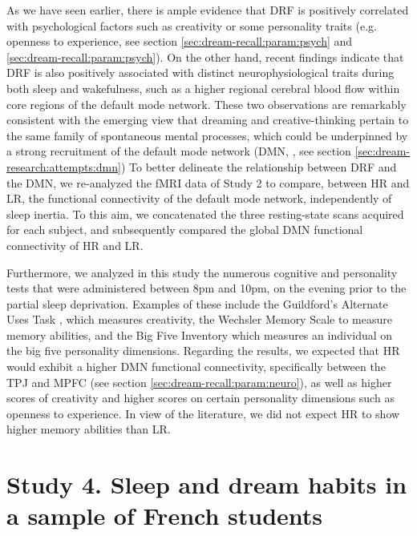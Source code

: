 As we have seen earlier, there is ample evidence that DRF is positively correlated with psychological factors such as creativity or some personality traits (e.g. openness to experience, see section \ref{sec:dream-recall:param:psych} and \ref{sec:dream-recall:param:psych}). On the other hand, recent findings indicate that DRF is also positively associated with distinct neurophysiological traits during both sleep and wakefulness, such as a higher regional cerebral blood flow within core regions of the default mode network. These two observations are remarkably consistent with the emerging view that dreaming and creative-thinking pertain to the same family of spontaneous mental processes, which could be underpinned by a strong recruitment of the default mode network (DMN, \citealp{christoff_mind-wandering_2016}, see section \ref{sec:dream-research:attempts:dmn}) To better delineate the relationship between DRF and the DMN, we re-analyzed the fMRI data of Study 2 to compare, between HR and LR, the functional connectivity of the default mode network, independently of sleep inertia. To this aim, we concatenated the three resting-state scans acquired for each subject, and subsequently compared the global DMN functional connectivity of HR and LR.

Furthermore, we analyzed in this study the numerous cognitive and personality tests that were administered between 8pm and 10pm, on the evening prior to the partial sleep deprivation. Examples of these include the Guildford's Alternate Uses Task \citep{guildford_alternate_1978}, which measures creativity, the Wechsler Memory Scale \citep{wechsler_mem-iii:_2001} to measure memory abilities, and the Big Five Inventory \citep{john_big_1999} which measures an individual on the big five personality dimensions. Regarding the results, we expected that HR would exhibit a higher DMN functional connectivity, specifically between the TPJ and MPFC (see section \ref{sec:dream-recall:param:neuro}), as well as higher scores of creativity and higher scores on certain personality dimensions such as openness to experience. In view of the literature, we did not expect HR to show higher memory abilities than LR.

\FloatBarrier

\section{Study 4. Sleep and dream habits in a sample of French students}
\label{sec:problematic:survey}

